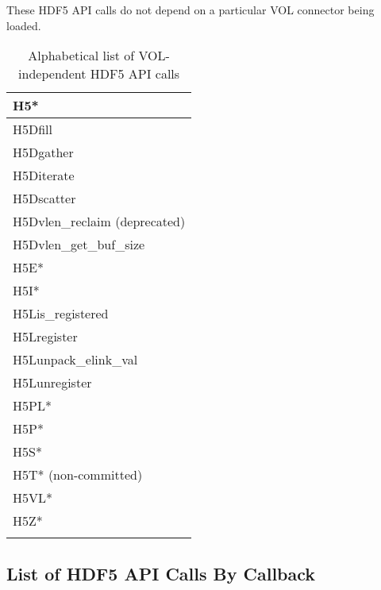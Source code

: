 These HDF5 API calls do not depend on a particular VOL connector being loaded.

\begin{longtable}{ |>{\raggedright\arraybackslash}p{\linewidth}| }
    \hline
    H5* \\
    \hline
    H5Dfill \\
    H5Dgather \\
    H5Diterate \\
    H5Dscatter \\
    H5Dvlen\_reclaim (deprecated) \\
    H5Dvlen\_get\_buf\_size \\
    \hline
    H5E* \\
    H5I* \\
    \hline
    H5Lis\_registered \\
    H5Lregister \\
    H5Lunpack\_elink\_val \\
    H5Lunregister \\
    \hline
    H5PL* \\
    H5P* \\
    H5S* \\
    H5T* (non-committed) \\
    H5VL* \\
    H5Z* \\
    \hline
\caption{Alphabetical list of VOL-independent HDF5 API calls}
\end{longtable}

\subsection{List of HDF5 API Calls By Callback}

